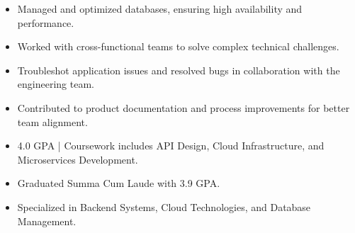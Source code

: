 \par\smallskip
\noindent
\begin{minipage}{20cm}
  \begin{minipage}{9.75cm}
    \begin{itemize}
      \item Managed and optimized databases, ensuring high availability and performance.
      \item Worked with cross-functional teams to solve complex technical challenges.
    \end{itemize}
  \end{minipage}
  \hfill
  \begin{minipage}{9.75cm}
    \begin{itemize}
      \item Troubleshot application issues and resolved bugs in collaboration with the engineering team.
      \item Contributed to product documentation and process improvements for better team alignment.
    \end{itemize}
  \end{minipage}
\end{minipage}
\par\smallskip
\divider

\begin{itemize}
  \item 4.0 GPA | Coursework includes API Design, Cloud Infrastructure, and Microservices Development.
\end{itemize}
\divider

\begin{itemize}
  \item Graduated Summa Cum Laude with 3.9 GPA.
  \item Specialized in Backend Systems, Cloud Technologies, and Database Management.
\end{itemize}

\noindent
\begin{minipage}{20cm}
\end{minipage}


